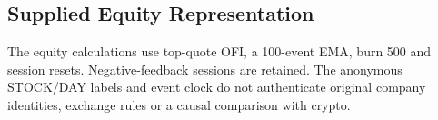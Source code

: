 \subsection{Supplied Equity Representation}
The equity calculations use top-quote OFI, a 100-event EMA, burn 500 and session resets. Negative-feedback sessions are retained. The anonymous STOCK/DAY labels and event clock do not authenticate original company identities, exchange rules or a causal comparison with crypto.
\begin{table}[htbp]
\centering\footnotesize\setlength{\tabcolsep}{3pt}
\caption{Supplied event-indexed equity representation: actual counts and means of separately reset sessions. The original stock/day mapping, decimal reconstruction and upstream licence require authentication; identities are not inferred from anonymous stock labels.}
\label{tab:equity_benchmark}
\end{table}

